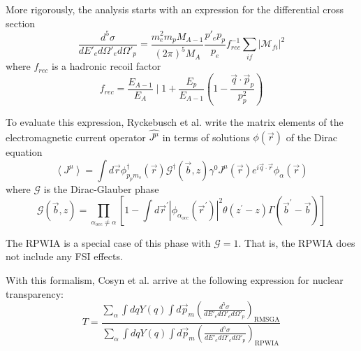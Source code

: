 More rigorously, the analysis starts with an expression for the differential
cross section
\begin{equation}
    \frac{d^5\sigma}{d E'_e d \Omega'_e d \Omega'_p} =
        \frac{m_{e}^{2} m_{p} M_{A-1}}{(2 \pi)^{5} M_{A}}
        \frac{p'_e p_p}{p_e}
        f_{rec}^{-1}
        \sum_{if}\left|\mathcal{M}_{fi}\right|^{2}
\end{equation}
where $f_{rec}$ is a hadronic recoil factor
\begin{equation}
    f_{rec}=\frac{E_{A-1}}{E_{A}} \mid
                    1+\frac{E_{p}}{E_{A-1}}\left(1-\frac{\vec{q} \cdot \vec{p}_{p}}{p_{p}^{2}}\right)
\end{equation}

To evaluate this expression, Ryckebusch et al. write the matrix elements of the
electromagnetic current operator $\hat{J^\mu}$ in terms of solutions
$\phi(\vec{r})$ of the Dirac equation
\begin{equation}
    \left\langle J^{\mu}\right\rangle=\int d \vec{r} \phi_{p_{p} m_{s}}^{\dagger}(\vec{r}) \mathcal{G}^{\dagger}(\vec{b}, z) \gamma^{0} J^{\mu}(\vec{r}) e^{i \vec{q} \cdot \vec{r}} \phi_{\alpha}(\vec{r})
\end{equation}
where $\mathcal{G}$ is the Dirac-Glauber phase
\begin{equation}
    \mathcal{G}(\vec{b}, z)=\prod_{\alpha_{\text{occ}}\neq\alpha}\left[1-\int d \vec{r}^{\prime}\left|\phi_{\alpha_{\mathrm{occ}}}\left(\vec{r}^{\prime}\right)\right|^{2} \theta\left(z^{\prime}-z\right) \Gamma\left(\vec{b}^{\prime}-\vec{b}\right)\right]
\end{equation}

The RPWIA is a special case of this phase with $\mathcal{G}=1$.
That is, the RPWIA does not include any FSI effects.

With this formalism, Cosyn et al. arrive at the following expression for
nuclear transparency:
\begin{equation}
    T= \frac{\sum_{\alpha} \int d q Y(q) \int d \vec{p}_{m} \left(\frac{d^5\sigma}{d E'_e d \Omega'_e d \Omega'_p} \right)_{\mathrm{RMSGA}}}
            {\sum_{\alpha} \int d q Y(q) \int d \vec{p}_{m} \left(\frac{d^5\sigma}{d E'_e d \Omega'_e d \Omega'_p} \right)_{\mathrm{RPWIA}}}
\end{equation}

